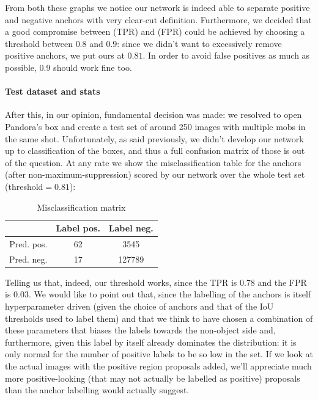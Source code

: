 \documentclass[10pt,journal,cspaper,compsoc]{IEEEtran}
\begin{document}
    From both these graphs we notice our network is indeed able to separate positive and negative anchors with very clear-cut definition. Furthermore, we decided that a good compromise between (TPR) and (FPR) could be achieved by choosing a threshold between $0.8$ and $0.9$: since we didn't want to excessively remove positive anchors, we put ours at $0.81$. In order to avoid false positives as much as possible, $0.9$ should work fine too.

    \paragraph*{Test dataset and stats} After this, in our opinion, fundamental decision was made: we resolved to open Pandora's box and create a test set of around 250 images with multiple mobs in the same shot. Unfortunately, as said previously, we didn't develop our network up to classification of the boxes, and thus a full confusion matrix of those is out of the question. At any rate we show the misclassification table for the anchors (after non-maximum-suppression) scored by our network over the whole test set (threshold$=0.81$):

    \begin{table}[htb]
        \centering
        \caption{Misclassification matrix}
        \begin{tabularx}{.3\textwidth}{r|c c}\label{tab:miscl}
            & Label pos. & Label neg. \\
            \hline
            Pred. pos. & 62 & 3545 \\
            Pred. neg. & 17 & 127789
        \end{tabularx}
    \end{table}

    Telling us that, indeed, our threshold works, since the TPR is $0.78$ and the FPR is $0.03$. We would like to point out that, since the labelling of the anchors is itself hyperparameter driven (given the choice of anchors and that of the IoU thresholds used to label them) and that we think to have chosen a combination of these parameters that biases the labels towards the non-object side and, furthermore, given this label by itself already dominates the distribution: it is only normal for the number of positive labels to be so low in the set. If we look at the actual images with the positive region proposals added, we'll appreciate much more positive-looking (that may not actually be labelled as positive) proposals than the anchor labelling would actually suggest.
\end{document}
